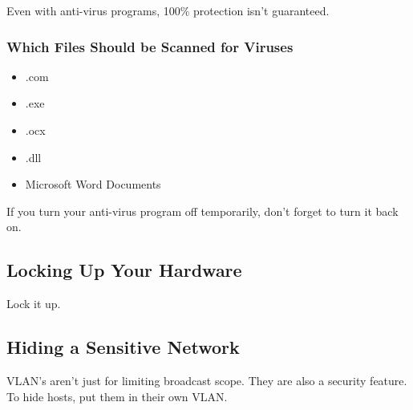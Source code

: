 Even with anti-virus programs, 100\% protection isn't guaranteed.

\subsubsection{Which Files Should be Scanned for Viruses}

\begin{itemize}
\item .com
\item .exe
\item .ocx
\item .dll
\item Microsoft Word Documents
\end{itemize}

If you turn your anti-virus program off temporarily, don't forget to turn it
back on.

\subsection{Locking Up Your Hardware}

Lock it up.

\subsection{Hiding a Sensitive Network}

VLAN's aren't just for limiting broadcast scope. They are also a security
feature. To hide hosts, put them in their own VLAN.
